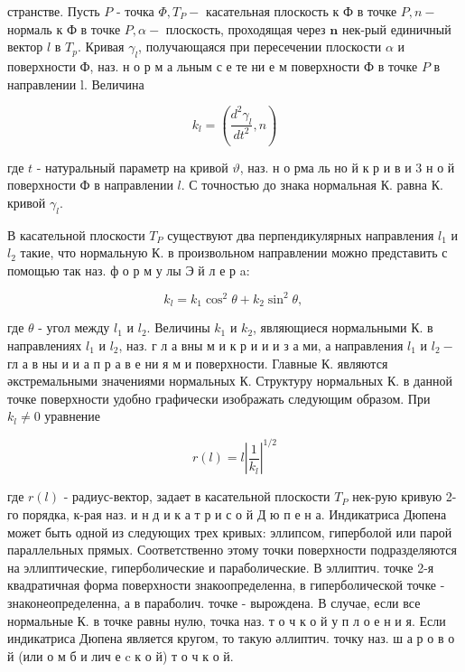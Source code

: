 \documentclass[10pt]{article}
\begin{document}
странстве. Пусть $P$ - точка $\Phi, T_{P}-$ касательная плоскость к Ф в точке $P, n-$ нормаль к Ф в точке $P, \alpha-$ плоскость, проходящая через $\boldsymbol{n}$ нек-рый единичный вектор $l$ в $T_{p}$. Кривая $\gamma_{l}$, получающаяся при пересечении плоскости $\alpha$ и поверхности Ф, наз. н о р м а льным с е те ни е м поверхности Ф в точке $P$ в направлении l. Величина



\[

k_{l}=\left(\frac{d^{2} \gamma_{l}}{d t^{2}}, n\right)

\]



где $t$ - натуральный параметр на кривой $\vartheta$, наз. н о рма ль но й к р и в и 3 н о й поверхности Ф в направлении $l$. С точностью до знака нормальная К. равна К. кривой $\gamma_{l}$.



В касательной плоскости $T_{P}$ существуют два перпендикулярных направления $l_{1}$ и $l_{2}$ такие, что нормальную К. в произвольном направлении можно представить с помощью так наз. ф о р м у лы Э й л е р a:



\[

k_{l}=k_{1} \cos ^{2} \theta+k_{2} \sin ^{2} \theta \text {, }

\]



где $\theta$ - угол между $l_{1}$ и $l_{2}$. Величины $k_{1}$ и $k_{2}$, являющиеся нормальными К. в направлениях $l_{1}$ и $l_{2}$, наз. г л а вны м и к р и и и з а ми, а направления $l_{1}$ и $l_{2}-$ гл а в ны и и а п р а в е ни я м и поверхности. Главные К. являются әкстремальными значениями нормальных К. Структуру нормальных К. в данной точке поверхности удобно графически изображать следующим образом. При $k_{l} \neq 0$ уравнение



\[

r(l)=l\left|\frac{1}{k_{l}}\right|^{1 / 2}

\]



где $r(l)$ - радиус-вектор, задает в касательной плоскости $T_{P}$ нек-рую кривую 2-го порядка, к-рая наз. и н д и к а т р и с о й Д ю п е н а. Индикатриса Дюпена может быть одной из следующих трех кривых: эллипсом, гиперболой или парой параллельных прямых. Соответственно этому точки поверхности подразделяются на эллиптические, гиперболические и параболические. В эллиптич. точке 2-я квадратичная форма поверхности знакоопределенна, в гиперболической точке - знаконеопределенна, а в параболич. точке - вырождена. В случае, если все нормальные К. в точке равны нулю, точка наз. т о ч к о й у п л о е н и я. Если индикатриса Дюпена является кругом, то такую әллиптич. точку наз. ш а р о в о й (или о м б и лич е c к о й) т о ч к о й.
\end{document}
